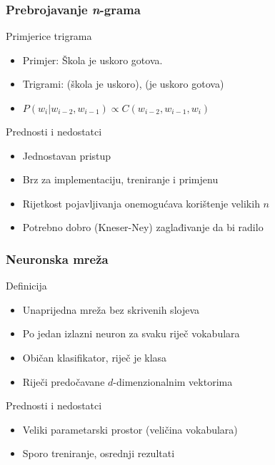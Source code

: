 \documentclass[utf8]{beamer}
\begin{document}
\begin{frame}
\frametitle{Prebrojavanje \textit{n}-grama}

	\begin{block}{Primjerice trigrama}
	\begin{itemize}[<+->]
		\item{Primjer: Škola je uskoro gotova.}
		\item{Trigrami: (škola je uskoro), (je uskoro gotova)}
		\item{$P(w_i | w_{i - 2}, w_{i - 1}) \propto C(w_{i - 2}, w_{i - 1}, w_i)$}
	\end{itemize}
	\end{block}

	\begin{block}{Prednosti i nedostatci}
	\begin{itemize}[<+->]
		\item{Jednostavan pristup}
		\item{Brz za implementaciju, treniranje i primjenu}
		\item{Rijetkost pojavljivanja onemogućava korištenje velikih $n$}
		\item{Potrebno dobro (Kneser-Ney) zaglađivanje da bi radilo}
	\end{itemize}
	\end{block}

\end{frame}

\begin{frame}
\frametitle{Neuronska mreža}

	\begin{block}{Definicija}
	\begin{itemize}[<+->]
		\item{Unaprijedna mreža bez skrivenih slojeva}
		\item{Po jedan izlazni neuron za svaku riječ vokabulara}
		\item{Običan klasifikator, riječ je klasa}
		\item{Riječi predočavane $d$-dimenzionalnim vektorima}
	\end{itemize}
	\end{block}

	\begin{block}{Prednosti i nedostatci}
	\begin{itemize}[<+->]
		\item{Veliki parametarski prostor (veličina vokabulara)}
		\item{Sporo treniranje, osrednji rezultati}
	\end{itemize}
	\end{block}
\end{frame}
\end{document}
